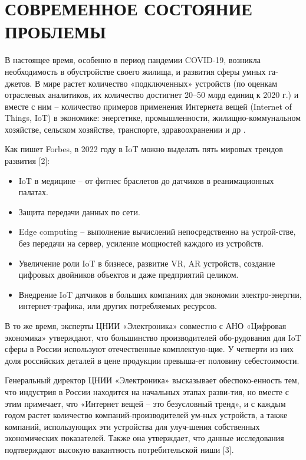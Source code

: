 
\section{СОВРЕМЕННОЕ СОСТОЯНИЕ ПРОБЛЕМЫ}

В настоящее время, особенно в период пандемии COVID-19, возникла необходимость в обустройстве своего жилища, и развития сферы умных га-джетов. В мире растет количество «подключенных» устройств (по оценкам отраслевых аналитиков, их количество достигнет 20–50 млрд единиц к 2020 г.) и вместе с ним – количество примеров применения Интернета вещей (Internet of Things, IoT) в экономике: энергетике, промышленности, жилищно-коммунальном хозяйстве, сельском хозяйстве, транспорте, здравоохранении и др \cite{pwc_iot_perspectives}.

Как пишет Forbes, в 2022 году в IoT можно выделать пять мировых трендов развития [2]:

\begin{itemize}
  \item IoT в медицине – от фитнес браслетов до датчиков в реанимационных палатах.
  \item Защита передачи данных по сети.
  \item Edge computing – выполнение вычислений непосредственно на устрой-стве, без передачи на сервер, усиление мощностей каждого из устройств.
  \item Увеличение роли IoT в бизнесе, развитие VR, AR устройств, создание цифровых двойников объектов и даже предприятий целиком.
  \item Внедрение IoT датчиков в больших компаниях для экономии электро-энергии, интернет-трафика, или других потребляемых ресурсов.
\end{itemize}

В то же время, эксперты ЦНИИ «Электроника» совместно с АНО «Цифровая экономика» утверждают, что большинство производителей обо-рудования для IoT сферы в России используют отечественные комплектую-щие. У четверти из них доля российских деталей в цене продукции превыша-ет половину себестоимости.

Генеральный директор ЦНИИ «Электроника» высказывает обеспоко-енность тем, что индустрия в России находится на начальных этапах разви-тия, но вместе с этим примечает, что «Интернет вещей – это безусловный тренд», и с каждым годом растет количество компаний-производителей ум-ных устройств, а также компаний, использующих эти устройства для улуч-шения собственных экономических показателей. Также она утверждает, что данные исследования подтверждают высокую вакантность потребительской ниши [3].


\clearpage


